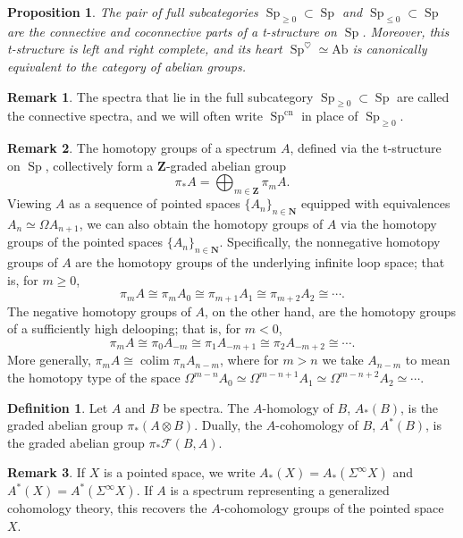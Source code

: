 \documentclass{article}
\newtheorem{proposition}{Proposition}[subsection]
\theoremstyle{definition}
\newtheorem{definition}{Definition}[subsection]
\newtheorem{remark}{Remark}[subsection]
\newcommand{\F}{\mathcal{F}}
\newcommand{\NN}{\mathbf{N}}
\newcommand{\ZZ}{\mathbf{Z}}
\DeclareMathOperator{\colim}{colim}
\DeclareMathOperator{\Sp}{Sp}
\newcommand{\Ab}{\mathrm{Ab}}
\newcommand{\cn}{\mathrm{cn}}
\begin{document}
\begin{proposition}{\em \cite[Proposition 1.4.3.6]{HA}}
The pair of full subcategories $\Sp_{\geq 0}\subset\Sp$ and $\Sp_{\leq 0}\subset\Sp$ are the connective and coconnective parts of a t-structure on $\Sp$.
Moreover, this t-structure is left and right complete, and its heart $\Sp^\heartsuit\simeq\Ab$ is canonically equivalent to the category of abelian groups.
\end{proposition}


\begin{remark}
The spectra that lie in the full subcategory $\Sp_{\geq 0}\subset\Sp$ are called the connective spectra, and we will often write $\Sp^{\cn}$ in place of $\Sp_{\geq 0}$.
\end{remark}

\begin{remark}
The homotopy groups of a spectrum $A$, defined via the t-structure on $\Sp$, collectively form a $\ZZ$-graded abelian group
\[
\pi_* A=\bigoplus_{m\in\ZZ}\pi_m A .
\]
Viewing $A$ as a sequence of pointed spaces $\{A_n\}_{n\in\NN}$ equipped with equivalences $A_n\simeq\Omega A_{n+1}$, we can also obtain the homotopy groups of $A$ via the homotopy groups of the pointed spaces $\{A_n\}_{n\in\NN}$.
Specifically, the nonnegative homotopy groups of $A$ are the homotopy groups of the underlying infinite loop space; that is, for $m\geq 0$,
\[
\pi_m A\cong\pi_m A_0\cong\pi_{m+1} A_1\cong\pi_{m+2}A_2\cong\cdots.
\]
The negative homotopy groups of $A$, on the other hand, are the homotopy groups of a sufficiently high delooping; that is, for $m<0$,
\[
\pi_m A\cong\pi_0 A_{-m}\cong\pi_1 A_{-m+1}\cong\pi_2 A_{-m+2}\cong\cdots.
\]
More generally, $\pi_m A\cong\colim\pi_{n} A_{n-m}$, where for $m>n$ we take $A_{n-m}$ to mean the homotopy type of the space $\Omega^{m-n}A_0\simeq\Omega^{m-n+1}A_1\simeq\Omega^{m-n+2}A_2\simeq\cdots$.
\end{remark}

\begin{definition}
Let $A$ and $B$ be spectra.
The $A$-homology of $B$, $A_*(B)$, is the graded abelian group $\pi_*(A\otimes B)$.
Dually, the $A$-cohomology of $B$, $A^*(B)$, is the graded abelian group $\pi_*\F(B,A)$.
\end{definition}

\begin{remark}
If $X$ is a pointed space, we write $A_*(X)=A_*(\Sigma^\infty X)$ and $A^*(X)=A^*(\Sigma^\infty X)$.
If $A$ is a spectrum representing a generalized cohomology theory, this recovers the $A$-cohomology groups of the pointed space $X$.
\end{remark}
\end{document}
